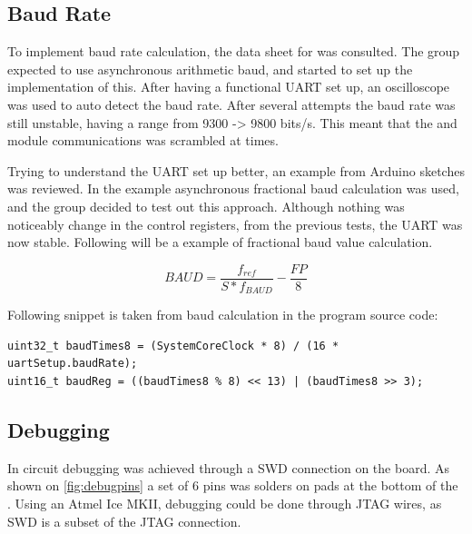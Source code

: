 \subsection{Baud Rate}
To implement baud rate calculation, the data sheet for \SAMD was consulted. The group expected to use asynchronous arithmetic baud, and started to set up the implementation of this. After having a functional UART set up, an oscilloscope was used to auto detect the baud rate. After several attempts the baud rate was still unstable, having a range from 9300 -> 9800 bits/s. This meant that the \GPS and \SARA module communications was scrambled at times.
 
Trying to understand the UART set up better, an example from Arduino sketches was reviewed. In the example asynchronous fractional baud calculation was used, and the group decided to test out this approach. Although nothing was noticeably change in the control registers, from the previous tests, the UART was now stable.
Following will be a example of fractional baud value calculation.

\[BAUD = \frac{f_{ref}}{S*f_{BAUD}} - \frac{FP}{8}\]

Following snippet is taken from baud calculation in the program source code:
\begin{verbatim}
uint32_t baudTimes8 = (SystemCoreClock * 8) / (16 * uartSetup.baudRate);
uint16_t baudReg = ((baudTimes8 % 8) << 13) | (baudTimes8 >> 3);	
\end{verbatim}

\subsection{Debugging}
In circuit debugging was achieved through a SWD connection on the \MKR board. As shown on \cref{fig:debugpins} a set of 6 pins was solders on pads at the bottom of the \MKR. Using an Atmel Ice MKII, debugging could be done through JTAG wires, as SWD is a subset of the JTAG connection.


